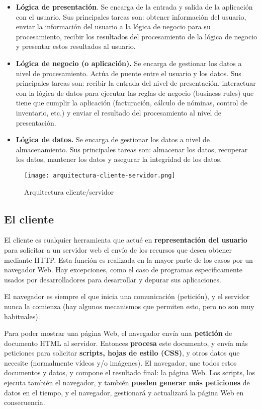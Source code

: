 \begin{itemize}
\item \textbf{Lógica de presentación}. Se encarga de la entrada y salida de la aplicación con
el usuario. Sus principales tareas son: obtener información del usuario, enviar la
información del usuario a la lógica de negocio para su procesamiento, recibir los
resultados del procesamiento de la lógica de negocio y presentar estos resultados
al usuario.

\item \textbf{Lógica de negocio (o aplicación).} Se encarga de gestionar los datos a nivel
de procesamiento. Actúa de puente entre el usuario y los datos. Sus principales
tareas son: recibir la entrada del nivel de presentación, interactuar con la lógica
de datos para ejecutar las reglas de negocio (business rules) que tiene que cumplir la aplicación (facturación, cálculo de nóminas, control de inventario, etc.) y
enviar el resultado del procesamiento al nivel de presentación.


\item \textbf{Lógica de datos.} Se encarga de gestionar los datos a nivel de almacenamiento.
Sus principales tareas son: almacenar los datos, recuperar los datos, mantener
los datos y asegurar la integridad de los datos.
\end{itemize}	

\begin{figure}[H]
	\center
	\texttt{[image: arquitectura-cliente-servidor.png]}
	\caption{Arquitectura cliente/servidor}
	\label{fig:super}
\end{figure}

\subsection{El cliente}
\cite{mdn}El cliente es cualquier herramienta que actué en \textbf{representación del usuario} para solicitar a
un servidor web el envío de los recursos que desea obtener mediante HTTP. Esta función es realizada en la mayor parte de los casos por un navegador Web. Hay excepciones, como el caso de programas específicamente usados por desarrolladores para desarrollar y depurar sus aplicaciones. 

El navegador es siempre el que inicia una comunicación (petición), y el servidor nunca la comienza (hay algunos mecanismos que permiten esto, pero no son muy habituales).  

Para poder mostrar una página Web, el navegador envía una \textbf{petición} de documento HTML al servidor. Entonces \textbf{procesa} este documento, y envía más peticiones para solicitar \textbf{scripts, hojas de estilo (CSS)}, y otros datos que necesite (normalmente vídeos y/o imágenes). El navegador, une todos estos documentos y datos, y compone el resultado final: la página Web. Los scripts, los ejecuta también el navegador, y también \textbf{pueden generar más peticiones} de datos en el tiempo, y el navegador, gestionará y actualizará la página Web en consecuencia. 

